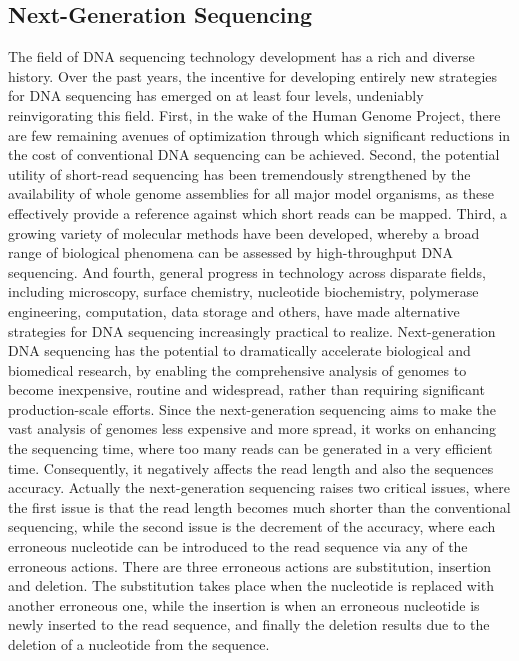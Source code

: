\documentclass{llncs}
\begin{document}
\subsection{Next-Generation Sequencing}
The field of DNA sequencing technology development has a rich and diverse history. Over the past years, the incentive for developing entirely new strategies for DNA sequencing has emerged on at least four levels, undeniably reinvigorating this field. First, in the wake of the Human Genome Project, there are few remaining avenues of optimization through which significant reductions in the cost of conventional DNA sequencing can be achieved. Second, the potential utility of short-read sequencing has been tremendously strengthened by the availability of whole genome assemblies for all major model organisms, as these effectively provide a reference against which short reads can be mapped. Third, a growing variety of molecular methods have been developed, whereby a broad range of biological phenomena can be assessed by high-throughput DNA sequencing. And fourth, general progress in technology across disparate fields, including microscopy, surface chemistry, nucleotide biochemistry, polymerase engineering, computation, data storage and others, have made alternative strategies for DNA sequencing increasingly practical to realize. Next-generation DNA sequencing has the potential to dramatically accelerate biological and biomedical research, by enabling the comprehensive analysis of genomes to become inexpensive, routine and widespread, rather than requiring significant production-scale efforts. Since the next-generation sequencing aims to make the vast analysis of genomes less expensive and more spread, it works on enhancing the sequencing time, where too many reads can be generated in a very efficient time. Consequently, it negatively affects the read length and also the sequences accuracy. Actually the next-generation sequencing raises two critical issues, where the first issue is that the read length becomes much shorter than the conventional sequencing, while the second issue is the decrement of the accuracy, where each erroneous nucleotide can be introduced to the read sequence via any of the erroneous actions. There are three erroneous actions are substitution, insertion and deletion. The substitution takes place when the nucleotide is replaced with another erroneous one, while the insertion is when an erroneous nucleotide is newly inserted to the read sequence, and finally the deletion results due to the deletion of a nucleotide from the sequence.
\end{document}
